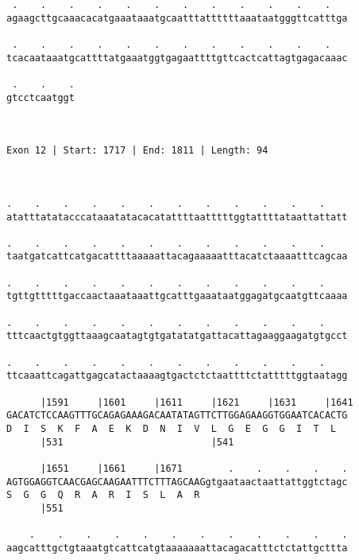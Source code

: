 \documentclass{article}
\begin{document}
\begin{Verbatim}
 .    .    .    .    .    .    .    .    .    .    .    .   
agaagcttgcaaacacatgaaataaatgcaatttattttttaaataatgggttcatttga
                                                            
 .    .    .    .    .    .    .    .    .    .    .    .   
tcacaataaatgcattttatgaaatggtgagaattttgttcactcattagtgagacaaac
                                                            
 .    .    .
gtcctcaatggt
            
            
 
Exon 12 | Start: 1717 | End: 1811 | Length: 94



.    .    .    .    .    .    .    .    .    .    .    .    
atatttatatacccataaatatacacatattttaatttttggtattttataattattatt
                                                            
.    .    .    .    .    .    .    .    .    .    .    .    
taatgatcattcatgacattttaaaaattacagaaaaatttacatctaaaatttcagcaa
                                                            
.    .    .    .    .    .    .    .    .    .    .    .    
tgttgtttttgaccaactaaataaattgcatttgaaataatggagatgcaatgttcaaaa
                                                            
.    .    .    .    .    .    .    .    .    .    .    .    
tttcaactgtggttaaagcaatagtgtgatatatgattacattagaaggaagatgtgcct
                                                            
.    .    .    .    .    .    .    .    .    .    .    .    
ttcaaattcagattgagcatactaaaagtgactctctaattttctatttttggtaatagg
                                                            
      |1591     |1601     |1611     |1621     |1631     |1641
GACATCTCCAAGTTTGCAGAGAAAGACAATATAGTTCTTGGAGAAGGTGGAATCACACTG
D  I  S  K  F  A  E  K  D  N  I  V  L  G  E  G  G  I  T  L  
      |531                          |541                    
  
      |1651     |1661     |1671        .    .    .    .    .
AGTGGAGGTCAACGAGCAAGAATTTCTTTAGCAAGgtgaataactaattattggtctagc
S  G  G  Q  R  A  R  I  S  L  A  R                          
      |551                                                  
  
    .    .    .    .    .    .    .    .    .    .    .    .
aagcatttgctgtaaatgtcattcatgtaaaaaaattacagacatttctctattgcttta
                                                            

\end{Verbatim}
\end{document}
